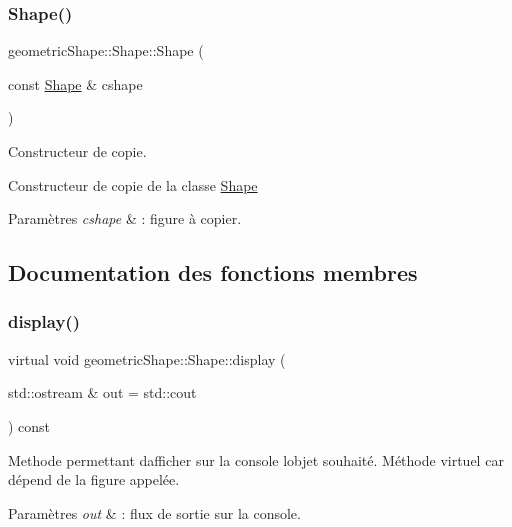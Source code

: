 \subsubsection{\texorpdfstring{Shape()}{Shape()}\hspace{0.1cm}{\footnotesize\ttfamily [2/2]}}
{\footnotesize\ttfamily geometric\+Shape\+::\+Shape\+::\+Shape (\begin{DoxyParamCaption}\item[{const \hyperlink{classgeometric_shape_1_1_shape}{Shape} \&}]{cshape }\end{DoxyParamCaption})}



Constructeur de copie. 

Constructeur de copie de la classe \hyperlink{classgeometric_shape_1_1_shape}{Shape} 
\begin{DoxyParams}{Paramètres}
{\em cshape} & \+: figure à copier. \\
\hline
\end{DoxyParams}


\subsection{Documentation des fonctions membres}
\mbox{\label{classgeometric_shape_1_1_shape_af666bd629db0595afa79982548b6cf78}} 
\subsubsection{\texorpdfstring{display()}{display()}}
{\footnotesize\ttfamily virtual void geometric\+Shape\+::\+Shape\+::display (\begin{DoxyParamCaption}\item[{std\+::ostream \&}]{out = {\ttfamily std\+:\+:cout} }\end{DoxyParamCaption}) const\hspace{0.3cm}{\ttfamily [virtual]}}



Methode permettant d\textquotesingle{}afficher sur la console l\textquotesingle{}objet souhaité. Méthode virtuel car dépend de la figure appelée. 


\begin{DoxyParams}{Paramètres}
{\em out} & \+: flux de sortie sur la console. \\
\hline
\end{DoxyParams}


